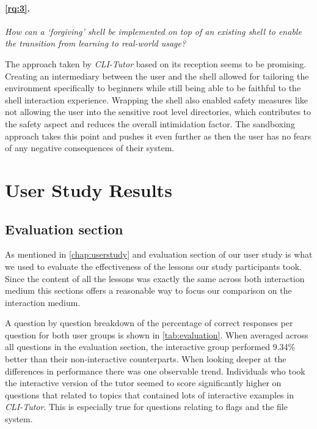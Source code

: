 \paragraph{\ref{rq:3}.} \textit{How can a `forgiving' shell be implemented on top of an existing
shell to enable the transition from learning to real-world usage?}

The approach taken by \textit{CLI-Tutor} based on its reception seems to be
promising. Creating an intermediary between the user and the shell allowed for
tailoring the environment specifically to beginners while still being able to
be faithful to the shell interaction experience. Wrapping the shell also enabled
safety measures like not allowing the user into the sensitive root level
directories, which contributes to the safety aspect and reduces the overall
intimidation factor. The sandboxing approach takes this point and pushes it
even further as then the user has no fears of any negative consequences of their system.



\section{User Study Results}

\subsection{Evaluation section}


As mentioned in \autoref{chap:userstudy} and evaluation section of our user
study is what we used to evaluate the effectiveness of the lessons our study
participants took. Since the content of all the lessons was exactly the same
across both interaction medium this sections offers a reasonable way to focus
our comparison on the interaction medium.

A question by question breakdown of the percentage of correct responses per
question for both user groups is shown in \autoref{tab:evaluation}. When
averaged across all questions in the evaluation section, the interactive group
performed 9.34\% better than their non-interactive counterparts. When looking
deeper at the differences in performance there was one observable trend.
Individuals who took the interactive version of the tutor seemed to score
significantly higher on questions that related to topics that contained lots of
interactive examples in \textit{CLI-Tutor}. This is especially true for
questions relating to flags and the file system.  

